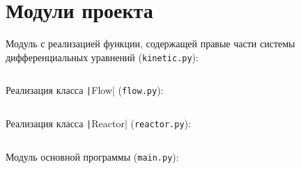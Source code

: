 \documentclass[10pt,a4paper]{article}
\begin{document}
\section*{Модули проекта}
Модуль с реализацией функции, содержащей правые части системы дифференциальных уравнений (\texttt{kinetic.py}):
\inputminted{python}{kinetic.py}
\newpage
Реализация класса \texttt|Flow| (\texttt{flow.py}):
\inputminted{python}{flow.py}

\newpage
Реализация класса \texttt|Reactor| (\texttt{reactor.py}):
\inputminted{python}{reactor.py}

\newpage
Модуль основной программы (\texttt{main.py}):
\inputminted{python}{main.py}
\end{document}
